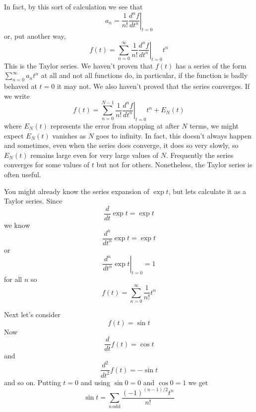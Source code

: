 \documentclass[12pt]{article}
\begin{document}
In fact, by this sort of calculation we see that
\begin{equation}
a_n=\frac{1}{n!}\left.\frac{d^nf}{dt^n}\right|_{t=0}
\end{equation}
or, put another way, 
\begin{equation}
f(t)=\sum_{n=0}^\infty\frac{1}{n!}\left.\frac{d^nf}{dt^n}\right|_{t=0}t^n
\end{equation}
This is the Taylor series. We haven't proven that $f(t)$ has a series
of the form $\sum_{n=0}^\infty a_nt^n$ at all and not all functions
do, in particular, if the function is badly behaved at $t=0$ it may
not. We also haven't proved that the series converges. If we write
\begin{equation}
f(t)=\sum_{n=0}^{N-1}\frac{1}{n!}\left.\frac{d^nf}{dt^n}\right|_{t=0}t^n+E_N(t)
\end{equation}
where $E_N(t)$ represents the error from stopping at after $N$ terms,
we might expect $E_N(t)$ vanishes as $N$ goes to infinity. In fact,
this doesn't always happen and sometimes, even when the series does
converge, it does so very slowly, so $E_N(t)$ remains large even for
very large values of $N$. Frequently the series converges for some
values of $t$ but not for others. Nonetheless, the Taylor series is
often useful.

You might already know the series expansion of $\exp{t}$, but lets
calculate it as a Taylor series. Since
\begin{equation}
\frac{d}{dt}\exp{t}=\exp{t}
\end{equation}
we know
\begin{equation}
\frac{d^n}{dt^n}\exp{t}=\exp{t}
\end{equation}
or
\begin{equation}
\left.\frac{d^n}{dt^n}\exp{t}\right|_{t=0}=1
\end{equation}
for all $n$ so
\begin{equation}
f(t)=\sum_{n=0}^{\infty}\frac{1}{n!}t^n
\end{equation}


Next let's consider
\begin{equation}
f(t)=\sin{t}
\end{equation}
Now 
\begin{equation}
\frac{d}{dt}f(t)=\cos{t}
\end{equation}
and
\begin{equation}
\frac{d^2}{dt^2}f(t)=-\sin{t}
\end{equation}
and so on. Putting $t=0$ and using $\sin{0}=0$ and $\cos{0}=1$ we get
\begin{equation}
\sin{t}=\sum_{n\,\mbox{odd}}\frac{(-1)^{(n-1)/2}t^n}{n!}
\end{equation}
\end{document}
